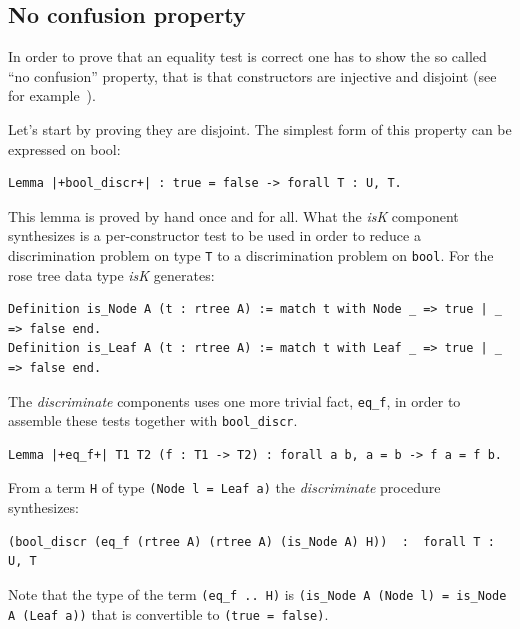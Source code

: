 \documentclass[a4paper,UKenglish,cleveref, autoref]{lipics-v2019}
\newcommand{\derive}[1]{\emph{#1}}
\begin{document}
\subsection{No confusion property} %

In order to prove that an equality test is correct
one has to show the so called ``no confusion'' property, that is that
constructors are injective and disjoint (see for
example~\cite{10.1007/11617990_12}).

Let's start by proving they are disjoint.
The simplest form of this property can be expressed on bool:

\begin{lstlisting}
Lemma |+bool_discr+| : true = false -> forall T : U, T.
\end{lstlisting}

\noindent
This lemma is proved by hand once and for all. What the \derive{isK}
component synthesizes is a per-constructor test to be used in order
to reduce a discrimination problem on type \lstinline+T+ to a
discrimination problem on \lstinline+bool+. For the rose tree data
type \derive{isK} generates:

\begin{lstlisting}
Definition is_Node A (t : rtree A) := match t with Node _ => true | _ => false end.
Definition is_Leaf A (t : rtree A) := match t with Leaf _ => true | _ => false end.
\end{lstlisting}

\noindent
The \derive{discriminate} components uses one more trivial fact,
\lstinline+eq_f+, in order to assemble these tests together
with \lstinline+bool_discr+.

\begin{lstlisting}
Lemma |+eq_f+| T1 T2 (f : T1 -> T2) : forall a b, a = b -> f a = f b.
\end{lstlisting}

\noindent
From a term \lstinline+H+ of type 
\lstinline+(Node l = Leaf a)+ the \derive{discriminate} procedure
synthesizes:

\begin{lstlisting}
(bool_discr (eq_f (rtree A) (rtree A) (is_Node A) H))  :  forall T : U, T
\end{lstlisting}

\noindent
Note that the type of the term \lstinline+(eq_f .. H)+ is
\lstinline+(is_Node A (Node l) = is_Node A (Leaf a))+
that is convertible to \lstinline+(true = false)+.
\\
\end{document}
